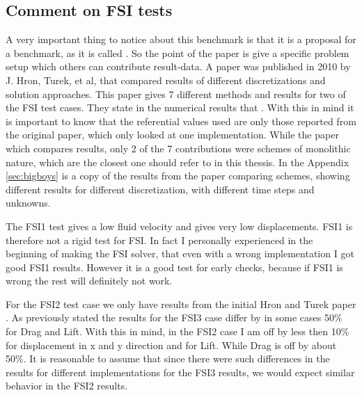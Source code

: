 \subsection*{Comment on FSI tests}
 A very important thing to notice about this benchmark \cite{Hron2006a} is that it is a proposal for a benchmark, as it is called . So the point of the paper is give a specific problem setup which others can contribute result-data. A paper was published in 2010 by J. Hron, Turek, et al, \cite{Turek2010} that compared results of different discretizations and solution approaches. This paper \cite{Turek2010} gives 7 different methods and results for two of the FSI test cases. They state in the numerical results that . With this in mind it is important to know that the referential values used are only those reported from the original paper, which only looked at one implementation. While the paper which compares results, only 2 of the 7 contributions were schemes of monolithic nature, which are the closest one should refer to in this thessis.  In the Appendix \ref{sec:bigboys} is a copy of the results from the paper comparing schemes, showing different results for different discretization, with different time steps and unknowns. 

The FSI1 test gives a low fluid velocity and gives very low displacements. FSI1 is therefore not a rigid test for FSI. In fact I personally experienced in the beginning of making the FSI solver, that even with a wrong implementation I got good FSI1 results. However it is a good test for early checks, because if FSI1 is wrong the rest will definitely not work.  \newline

For the FSI2 test case we only have results from the initial Hron and Turek paper \cite{Hron2006a}. As previously stated the results for the FSI3 case differ by in some cases 50\% for Drag and Lift. With this in mind, in the FSI2 case I am off by less then 10\% for displacement in x and y direction and for Lift. While Drag is off by about  50\%. It is reasonable to assume that since there were such differences in the results for different implementations for the FSI3 results, we would expect similar behavior in the FSI2 results.

